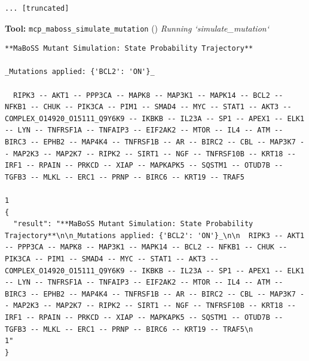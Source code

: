 \documentclass[11pt,a4paper]{article}
\begin{document}
\begin{toolokbox}
\begin{lstlisting}
... [truncated]
\end{lstlisting}
\end{toolokbox}
\begin{toolokbox}
\textbf{Tool:} \texttt{mcp\_maboss\_simulate\_mutation} (\checkmark)
\textit{Running `simulate\_mutation`}
\begin{lstlisting}
**MaBoSS Mutant Simulation: State Probability Trajectory**

_Mutations applied: {'BCL2': 'ON'}_

  RIPK3 -- AKT1 -- PPP3CA -- MAPK8 -- MAP3K1 -- MAPK14 -- BCL2 -- NFKB1 -- CHUK -- PIK3CA -- PIM1 -- SMAD4 -- MYC -- STAT1 -- AKT3 -- COMPLEX_O14920_O15111_Q9Y6K9 -- IKBKB -- IL23A -- SP1 -- APEX1 -- ELK1 -- LYN -- TNFRSF1A -- TNFAIP3 -- EIF2AK2 -- MTOR -- IL4 -- ATM -- BIRC3 -- EPHB2 -- MAP4K4 -- TNFRSF1B -- AR -- BIRC2 -- CBL -- MAP3K7 -- MAP2K3 -- MAP2K7 -- RIPK2 -- SIRT1 -- NGF -- TNFRSF10B -- KRT18 -- IRF1 -- RPAIN -- PRKCD -- XIAP -- MAPKAPK5 -- SQSTM1 -- OTUD7B -- TGFB3 -- MLKL -- ERC1 -- PRNP -- BIRC6 -- KRT19 -- TRAF5
                                                                                                                                                                                                                                                                                                                                                                                                                                                                                                                                                   1
{
  "result": "**MaBoSS Mutant Simulation: State Probability Trajectory**\n\n_Mutations applied: {'BCL2': 'ON'}_\n\n  RIPK3 -- AKT1 -- PPP3CA -- MAPK8 -- MAP3K1 -- MAPK14 -- BCL2 -- NFKB1 -- CHUK -- PIK3CA -- PIM1 -- SMAD4 -- MYC -- STAT1 -- AKT3 -- COMPLEX_O14920_O15111_Q9Y6K9 -- IKBKB -- IL23A -- SP1 -- APEX1 -- ELK1 -- LYN -- TNFRSF1A -- TNFAIP3 -- EIF2AK2 -- MTOR -- IL4 -- ATM -- BIRC3 -- EPHB2 -- MAP4K4 -- TNFRSF1B -- AR -- BIRC2 -- CBL -- MAP3K7 -- MAP2K3 -- MAP2K7 -- RIPK2 -- SIRT1 -- NGF -- TNFRSF10B -- KRT18 -- IRF1 -- RPAIN -- PRKCD -- XIAP -- MAPKAPK5 -- SQSTM1 -- OTUD7B -- TGFB3 -- MLKL -- ERC1 -- PRNP -- BIRC6 -- KRT19 -- TRAF5\n                                                                                                                                                                                                                                                                                                                                                                                                                                                                                                                                                   1"
}
\end{lstlisting}
\end{toolokbox}
\end{document}
